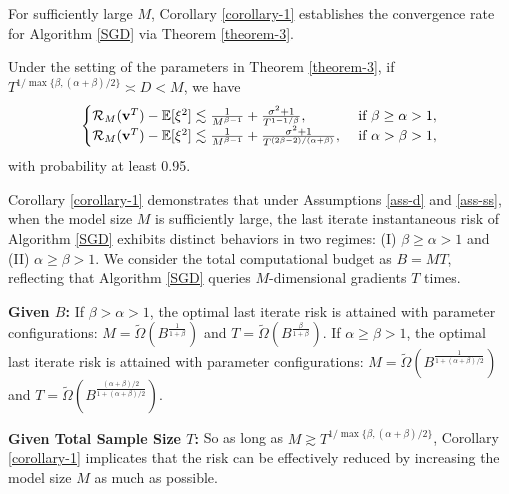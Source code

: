 For sufficiently large $M$, Corollary \ref{corollary-1} establishes the convergence rate for Algorithm \ref{SGD} via Theorem \ref{theorem-3}.
\begin{corollary}\label{corollary-1}
    Under the setting of the parameters in Theorem \ref{theorem-3}, if $T^{1/\max\{\beta,(\alpha+\beta)/2\}}\asymp D<M$, we have
    \begin{align}
        \begin{cases}
            \mathcal{R}_M(\mathbf{v}^T)-\mathbb{E}[\xi^2]\lesssim \frac{1}{M^{\beta-1}}+\frac{\sigma^2+1}{T^{1-1/\beta}}, & \text{ if }\beta\ge \alpha>1,
            \\
            \mathcal{R}_M(\mathbf{v}^T)-\mathbb{E}[\xi^2]\lesssim \frac{1}{M^{\beta-1}}+\frac{\sigma^2+1}{T^{(2\beta-2)/(\alpha+\beta)}}, & \text{ if } \alpha>\beta >1,\notag
        \end{cases}
    \end{align}
    with probability at least 0.95.
\end{corollary}
Corollary \ref{corollary-1} demonstrates that under Assumptions \ref{ass-d} and \ref{ass-ss}, when the model size $M$ is sufficiently large, the last iterate instantaneous risk of Algorithm \ref{SGD} exhibits distinct behaviors in two regimes: (I) $\beta\geq\alpha>1$ and (II) $\alpha\geq\beta>1$. 
We consider the total computational budget
 as $B=MT$, reflecting that Algorithm \ref{SGD} queries $M$-dimensional gradients $T$ times. 

\noindent \textbf{Given $B$: } If $\beta>\alpha>1$, the optimal last iterate risk is attained with parameter configurations: $M=\widetilde{\Omega}(B^{\frac{1}{1+\beta}})$ and $T=\widetilde{\Omega}(B^{\frac{\beta}{1+\beta}})$. If $\alpha\geq\beta>1$, the optimal last iterate risk is attained with parameter configurations: $M=\widetilde{\Omega}(B^{\frac{1}{1+(\alpha+\beta)/2}})$ and $T=\widetilde{\Omega}(B^{\frac{(\alpha+\beta)/2}{1+(\alpha+\beta)/2}})$.

\noindent \textbf{Given Total Sample Size $T$: } So as long as  $M\gtrsim T^{1/\max\{\beta,(\alpha+\beta)/2\}}$, Corollary \ref{corollary-1} implicates that the risk can be effectively reduced by increasing the model size $M$ as much as possible.

